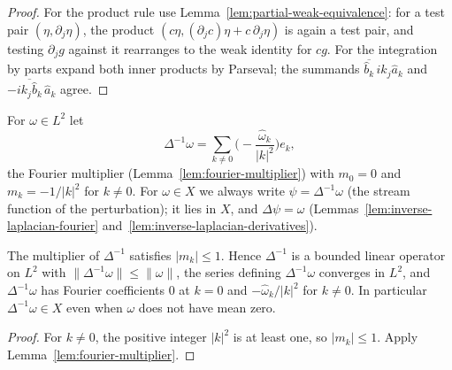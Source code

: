 \begin{proof}
\leanok
For the product rule use Lemma~\ref{lem:partial-weak-equivalence}: for a test pair
$(\eta,\partial_j\eta)$, the product $(c\eta,(\partial_jc)\eta+c\,\partial_j\eta)$ is again a
test pair, and testing $\partial_jg$ against it rearranges to the weak identity for $cg$.
For the integration by parts expand both inner products by Parseval; the summands
$\overline{\hat b_k}\,ik_j\hat a_k$ and $-\overline{ik_j\hat b_k}\,\hat a_k$ agree.
\end{proof}

\begin{definition}
\label{def:inverse-laplacian}
\leanok
For $\omega\in L^2$ let
\[
  \Delta^{-1}\omega=\sum_{k\ne0}\Big(-\frac{\hat\omega_k}{|k|^2}\Big)e_k,
\]
the Fourier multiplier (Lemma~\ref{lem:fourier-multiplier}) with $m_0=0$ and
$m_k=-1/|k|^2$ for $k\ne0$.
For $\omega\in X$ we always write $\psi=\Delta^{-1}\omega$ (the stream function
of the perturbation); it lies in $X$, and $\Delta\psi=\omega$
(Lemmas~\ref{lem:inverse-laplacian-fourier}
and~\ref{lem:inverse-laplacian-derivatives}).
\end{definition}

\begin{lemma}
\label{lem:inverse-laplacian-fourier}
\leanok
The multiplier of $\Delta^{-1}$ satisfies $|m_k|\le1$. Hence $\Delta^{-1}$ is
a bounded linear operator on $L^2$ with $\|\Delta^{-1}\omega\|\le\|\omega\|$,
the series defining $\Delta^{-1}\omega$ converges in $L^2$, and
$\Delta^{-1}\omega$ has Fourier coefficients $0$ at $k=0$ and
$-\hat\omega_k/|k|^2$ for $k\ne0$. In particular $\Delta^{-1}\omega\in X$ even
when $\omega$ does not have mean zero.
\end{lemma}

\begin{proof}
\leanok
For $k\ne0$, the positive integer $|k|^2$ is at least one, so $|m_k|\le1$.
Apply Lemma~\ref{lem:fourier-multiplier}.
\end{proof}


